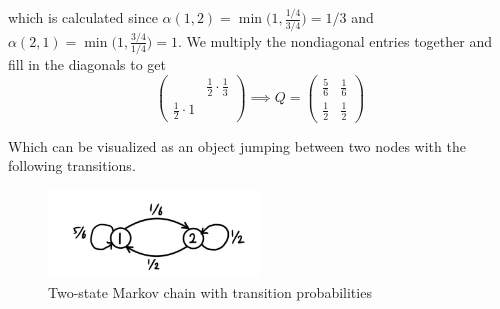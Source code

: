   which is calculated since $\alpha(1, 2) = \min\big(1, \frac{1/4}{3/4} \big) = 1/3$ and $\alpha(2, 1) = \min \big(1, \frac{3/4}{1/4} \big) = 1$. We multiply the nondiagonal entries together and fill in the diagonals to get
  \begin{equation}
    \begin{pmatrix} & \frac{1}{2} \cdot \frac{1}{3} \\ \frac{1}{2} \cdot 1 & \end{pmatrix} \implies 
    Q = \begin{pmatrix} \frac{5}{6} & \frac{1}{6} \\ \frac{1}{2} & \frac{1}{2} \end{pmatrix}
  \end{equation}

  Which can be visualized as an object jumping between two nodes with the following transitions.

  \begin{figure}[H]
    \centering
    \includegraphics[width=0.5\textwidth]{img/2_state_chain.jpg}
    \caption{Two-state Markov chain with transition probabilities}
  \end{figure}

